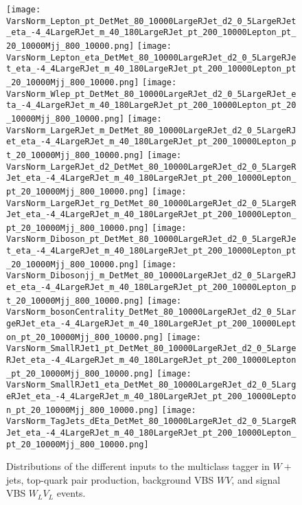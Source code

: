 \documentclass[amsmath,amssymb,aps,prd,preprint,groupedaddress]{revtex4-2}
\begin{document}
\begin{figure}[thb]
  \centering
  \texttt{[image: VarsNorm\_Lepton\_pt\_DetMet\_80\_10000LargeRJet\_d2\_0\_5LargeRJet\_eta\_-4\_4LargeRJet\_m\_40\_180LargeRJet\_pt\_200\_10000Lepton\_pt\_20\_10000Mjj\_800\_10000.png]}  
  \texttt{[image: VarsNorm\_Lepton\_eta\_DetMet\_80\_10000LargeRJet\_d2\_0\_5LargeRJet\_eta\_-4\_4LargeRJet\_m\_40\_180LargeRJet\_pt\_200\_10000Lepton\_pt\_20\_10000Mjj\_800\_10000.png]}
  \texttt{[image: VarsNorm\_Wlep\_pt\_DetMet\_80\_10000LargeRJet\_d2\_0\_5LargeRJet\_eta\_-4\_4LargeRJet\_m\_40\_180LargeRJet\_pt\_200\_10000Lepton\_pt\_20\_10000Mjj\_800\_10000.png]}  
  \texttt{[image: VarsNorm\_LargeRJet\_m\_DetMet\_80\_10000LargeRJet\_d2\_0\_5LargeRJet\_eta\_-4\_4LargeRJet\_m\_40\_180LargeRJet\_pt\_200\_10000Lepton\_pt\_20\_10000Mjj\_800\_10000.png]} 
  \texttt{[image: VarsNorm\_LargeRJet\_d2\_DetMet\_80\_10000LargeRJet\_d2\_0\_5LargeRJet\_eta\_-4\_4LargeRJet\_m\_40\_180LargeRJet\_pt\_200\_10000Lepton\_pt\_20\_10000Mjj\_800\_10000.png]} 
  \texttt{[image: VarsNorm\_LargeRJet\_rg\_DetMet\_80\_10000LargeRJet\_d2\_0\_5LargeRJet\_eta\_-4\_4LargeRJet\_m\_40\_180LargeRJet\_pt\_200\_10000Lepton\_pt\_20\_10000Mjj\_800\_10000.png]} 
  \texttt{[image: VarsNorm\_Diboson\_pt\_DetMet\_80\_10000LargeRJet\_d2\_0\_5LargeRJet\_eta\_-4\_4LargeRJet\_m\_40\_180LargeRJet\_pt\_200\_10000Lepton\_pt\_20\_10000Mjj\_800\_10000.png]} 
  \texttt{[image: VarsNorm\_Dibosonjj\_m\_DetMet\_80\_10000LargeRJet\_d2\_0\_5LargeRJet\_eta\_-4\_4LargeRJet\_m\_40\_180LargeRJet\_pt\_200\_10000Lepton\_pt\_20\_10000Mjj\_800\_10000.png]}
  \texttt{[image: VarsNorm\_bosonCentrality\_DetMet\_80\_10000LargeRJet\_d2\_0\_5LargeRJet\_eta\_-4\_4LargeRJet\_m\_40\_180LargeRJet\_pt\_200\_10000Lepton\_pt\_20\_10000Mjj\_800\_10000.png]} 
  \texttt{[image: VarsNorm\_SmallRJet1\_pt\_DetMet\_80\_10000LargeRJet\_d2\_0\_5LargeRJet\_eta\_-4\_4LargeRJet\_m\_40\_180LargeRJet\_pt\_200\_10000Lepton\_pt\_20\_10000Mjj\_800\_10000.png]} 
  \texttt{[image: VarsNorm\_SmallRJet1\_eta\_DetMet\_80\_10000LargeRJet\_d2\_0\_5LargeRJet\_eta\_-4\_4LargeRJet\_m\_40\_180LargeRJet\_pt\_200\_10000Lepton\_pt\_20\_10000Mjj\_800\_10000.png]} 
  \texttt{[image: VarsNorm\_TagJets\_dEta\_DetMet\_80\_10000LargeRJet\_d2\_0\_5LargeRJet\_eta\_-4\_4LargeRJet\_m\_40\_180LargeRJet\_pt\_200\_10000Lepton\_pt\_20\_10000Mjj\_800\_10000.png]} 
  \caption{Distributions of the different inputs to the multiclass tagger in $W+$jets, top-quark pair production, background VBS $WV$, and signal VBS $W_{L}V_{L}$ events.}
  \label{fig:taggerInputs}
\end{figure}
\end{document}
